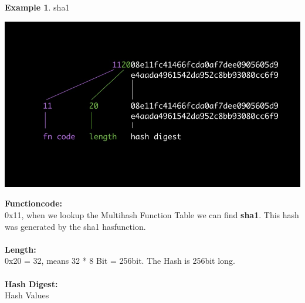 \documentclass[a4paper,11pt, oneside]{report}
\theoremstyle{definition}
\newtheorem{exmp}{Example}[subsection]
\begin{document}
\begin{exmp} sha1
\begin{center}
	\includegraphics[width=\textwidth]{img/multihash_example.jpg}
\end{center}
\textbf{Functioncode:}\\
0x11, when we lookup the Multihash Function Table we can find \textbf{sha1}. This hash was generated by the sha1 hasfunction.\\ \\
\textbf{Length:}\\
0x20 = 32, means 32 * 8 Bit = 256bit. The Hash is 256bit long.\\ \\
\textbf{Hash Digest:}\\ Hash Values 
\end{exmp}

\newpage
\end{document}
